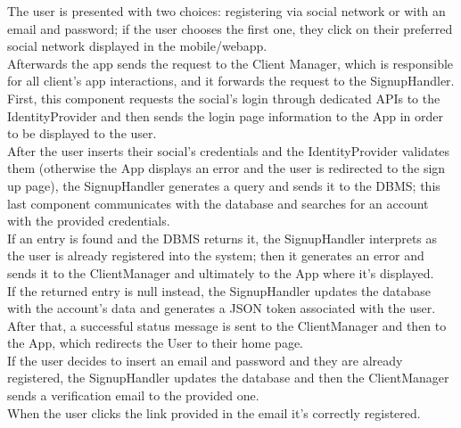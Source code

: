 \documentclass[table, 12pt]{article}
\begin{document}
The user is presented with two choices: registering via social network or with an email and password; if the user chooses the first one, they click on their preferred social network displayed in the mobile/webapp.\\
Afterwards the app sends the request to the Client Manager, which is responsible for all client's app interactions, and it forwards the request to the SignupHandler.\\
First, this component requests the social's login through dedicated APIs to the IdentityProvider and then sends the login page information to the App in order to be displayed to the user.\\
After the user inserts their social's credentials and the IdentityProvider validates them (otherwise the App displays an error and the user is redirected to the sign up page), the SignupHandler generates a query and sends it to the DBMS; this last component communicates with the database and searches for an account with the provided credentials.\\
If an entry is found and the DBMS returns it, the SignupHandler interprets as the user is already registered into the system; then it generates an error and sends it to the ClientManager and ultimately to the App where it's displayed.\\
If the returned entry is null instead, the SignupHandler updates the database with the account's data and generates a JSON token associated with the user.\\
After that, a successful status message is sent to the ClientManager and then to the App, which redirects the User to their home page.\\
If the user decides to insert an email and password and they are already registered, the SignupHandler updates the database and then the ClientManager sends a verification email to the provided one.\\
When the user clicks the link provided in the email it's correctly registered.
\end{document}
